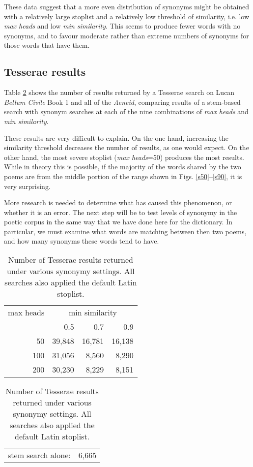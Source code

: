 \documentclass[]{article}
\begin{document}
	These data suggest that a more even distribution of synonyms might be obtained with a relatively large stoplist and a relatively low threshold of similarity, i.e. low \emph{max heads} and low \emph{min similarity}.  This seems to produce fewer words with no synonyms, and to favour moderate rather than extreme numbers of synonyms for those words that have them.
	
	\subsection{Tesserae results}
	
	Table \ref{tesresults} shows the number of results returned by a Tesserae search on Lucan \emph{Bellum Civile} Book 1 and all of the \emph{Aeneid}, comparing results of a stem-based search with synonym searches at each of the nine combinations of \emph{max heads} and \emph{min similarity}.
	
	These results are very difficult to explain.  On the one hand, increasing the similarity threshold decreases the number of results, as one would expect.  On the other hand, the most severe stoplist (\emph{max heads}=50) produces the most results.  While in theory this is possible, if the majority of the words shared by the two poems are from the middle portion of the range shown in Figs. \ref{s50}–\ref{s90}, it is very surprising.
	
	More research is needed to determine what has caused this phenomenon, or whether it is an error.  The next step will be to test levels of synonymy in the poetic corpus in the same way that we have done here for the dictionary.  In particular, we must examine what words are matching between then two poems, and how many synonyms these words tend to have.
	
	\begin{table}
	\caption{Number of Tesserae results returned under various synonymy settings.  All searches also applied the default Latin stoplist.\label{tesresults}}
	
	\vspace{1em}

	\begin{tabular}{r|rrr}
		max heads	&	\multicolumn{3}{c}{min similarity} 	\\
						&	0.5		&	0.7		&	0.9 			\\		\hline
				 50	&	39,848	&	16,781	&	16,138		\\
				100	&	31,056	&	 8,560	&	 8,290		\\
				200	&	30,230	&	 8,229	&	 8,151		\\
	\end{tabular}

	\vspace{1em}

	\begin{tabular}{ll}
			stem search alone:	&	6,665
	\end{tabular}

	\end{table}
	
\end{document}
